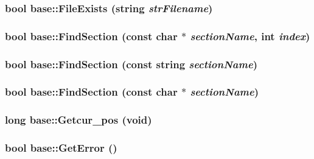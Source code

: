 \label{classbase_af2a52574d11ffe404e59c3b609b9853c}
\hypertarget{classbase_a7e46bf398988aee085433dd074edff44}{
\subsubsection[{FileExists}]{\setlength{\rightskip}{0pt plus 5cm}bool base::FileExists (string {\em strFilename})}}
\label{classbase_a7e46bf398988aee085433dd074edff44}
\hypertarget{classbase_afec295182d9081861379a5cd10b62ca7}{
\subsubsection[{FindSection}]{\setlength{\rightskip}{0pt plus 5cm}bool base::FindSection (const char $\ast$ {\em sectionName}, \/  int {\em index})}}
\label{classbase_afec295182d9081861379a5cd10b62ca7}
\hypertarget{classbase_af8ea646e73b042204ee13bb9e1528a44}{
\subsubsection[{FindSection}]{\setlength{\rightskip}{0pt plus 5cm}bool base::FindSection (const string {\em sectionName})}}
\label{classbase_af8ea646e73b042204ee13bb9e1528a44}
\hypertarget{classbase_a88e41ff60ffb7e707312a09f20457e73}{
\subsubsection[{FindSection}]{\setlength{\rightskip}{0pt plus 5cm}bool base::FindSection (const char $\ast$ {\em sectionName})}}
\label{classbase_a88e41ff60ffb7e707312a09f20457e73}
\hypertarget{classbase_ab2462023b3d3545dc322beba514ca871}{
\subsubsection[{Getcur\_\-pos}]{\setlength{\rightskip}{0pt plus 5cm}long base::Getcur\_\-pos (void)}}
\label{classbase_ab2462023b3d3545dc322beba514ca871}
\hypertarget{classbase_a3bd68866b69ba97fbfc68152fd864408}{
\subsubsection[{GetError}]{\setlength{\rightskip}{0pt plus 5cm}bool base::GetError ()}}
